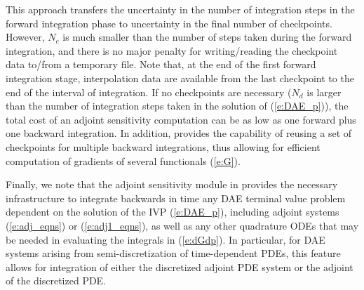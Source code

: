 This approach transfers the uncertainty in the number of integration
steps in the forward integration phase to uncertainty in the final
number of checkpoints.  However, $N_c$ is much smaller than the number
of steps taken during the forward integration, and there is no major
penalty for writing/reading the checkpoint data to/from a temporary
file.
%
Note that, at the end of the first forward integration stage, interpolation
data are available from the last checkpoint to the end of the interval
of integration.  If no checkpoints are necessary ($N_d$ is larger than the
number of integration steps taken in the solution of (\ref{e:DAE_p})),
the total cost of an adjoint sensitivity computation can be as low as one forward
plus one backward integration.
%
In addition, {\idas} provides the capability of reusing a set of checkpoints
for multiple backward integrations, thus allowing for efficient computation of
gradients of several functionals (\ref{e:G}).

\bigskip

Finally, we note that the adjoint sensitivity module in {\idas} provides the
necessary infrastructure to integrate backwards in time any DAE terminal value
problem dependent on the solution of the IVP (\ref{e:DAE_p}), including
adjoint systems (\ref{e:adj_eqns}) or (\ref{e:adj1_eqns}), as well as any other
quadrature ODEs that may be needed in evaluating the integrals in (\ref{e:dGdp}).
In particular, for DAE systems arising from semi-discretization
of time-dependent PDEs, this feature allows for integration of either the
discretized adjoint PDE system or the adjoint of the discretized PDE.


